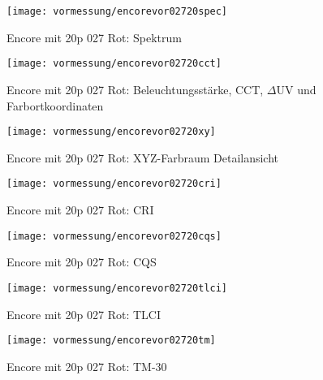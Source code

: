 \documentclass[pagesize,paper=A4,fontsize=12pt,utf8,numbers=noenddot,bibliography=totoc,listof=totoc,DIV=11,BCOR=1mm]{scrreprt}
\begin{document}
\begin{figure}[htp]     %
\centering
\texttt{[image: vormessung/encorevor02720spec]} 
\caption {Encore mit 20p 027 Rot: Spektrum} 
\end{figure}

\begin{figure}[htp]     %
\centering
\texttt{[image: vormessung/encorevor02720cct]} 
\caption {Encore mit 20p 027 Rot: Beleuchtungsstärke, CCT, $\Delta$UV und Farbortkoordinaten} 
\end{figure}

\begin{figure}[htp]     %
\centering
\texttt{[image: vormessung/encorevor02720xy]} 
\caption {Encore mit 20p 027 Rot: XYZ-Farbraum Detailansicht} 
\end{figure}

\begin{figure}[htp]     %
\centering
\texttt{[image: vormessung/encorevor02720cri]} 
\caption {Encore mit 20p 027 Rot: CRI} 
\end{figure}

\begin{figure}[htp]     %
\centering
\texttt{[image: vormessung/encorevor02720cqs]} 
\caption {Encore mit 20p 027 Rot: CQS} 
\end{figure}

\begin{figure}[htp]     %
\centering
\texttt{[image: vormessung/encorevor02720tlci]} 
\caption {Encore mit 20p 027 Rot: TLCI} 
\end{figure}

\begin{figure}[htp]     %
\centering
\texttt{[image: vormessung/encorevor02720tm]} 
\caption {Encore mit 20p 027 Rot: TM-30} 
\end{figure}
\end{document}
